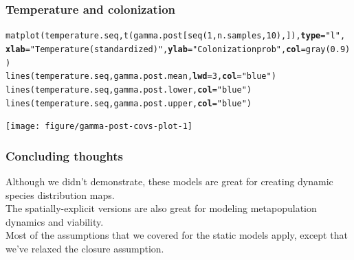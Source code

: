\documentclass[color=usenames,dvipsnames]{beamer}\usepackage[]{graphicx}\usepackage[]{color}
\makeatletter
\newcommand{\hlnum}[1]{\textcolor[rgb]{0.69,0.494,0}{#1}}%
\newcommand{\hlstr}[1]{\textcolor[rgb]{0.749,0.012,0.012}{#1}}%
\newcommand{\hlstd}[1]{\textcolor[rgb]{0,0,0}{#1}}%
\newcommand{\hlkwc}[1]{\textcolor[rgb]{0,0,0}{\textbf{#1}}}%
\newcommand{\hlkwd}[1]{\textcolor[rgb]{0.004,0.004,0.506}{#1}}%
\newenvironment{kframe}{%
 \def\at@end@of@kframe{}%
 \ifinner\ifhmode%
  \def\at@end@of@kframe{\end{minipage}}%
  \begin{minipage}{\columnwidth}%
 \fi\fi%
 \def\FrameCommand##1{\hskip\@totalleftmargin \hskip-\fboxsep
 \colorbox{shadecolor}{##1}\hskip-\fboxsep
     \hskip-\linewidth \hskip-\@totalleftmargin \hskip\columnwidth}%
 \MakeFramed {\advance\hsize-\width
   \@totalleftmargin\z@ \linewidth\hsize
   \@setminipage}}%
 {\par\unskip\endMakeFramed%
 \at@end@of@kframe}
\newenvironment{knitrout}{}{} %
\makeatother
\begin{document}
\begin{frame}[fragile]
  \frametitle{Temperature and colonization}
\begin{knitrout}\scriptsize
{}\color{fgcolor}\begin{kframe}
\begin{alltt}
\hlkwd{matplot}\hlstd{(temperature.seq,} \hlkwd{t}\hlstd{(gamma.post[}\hlkwd{seq}\hlstd{(}\hlnum{1}\hlstd{,n.samples,}\hlnum{10}\hlstd{),]),} \hlkwc{type}\hlstd{=}\hlstr{"l"}\hlstd{,}
        \hlkwc{xlab}\hlstd{=}\hlstr{"Temperature (standardized)"}\hlstd{,} \hlkwc{ylab}\hlstd{=}\hlstr{"Colonization prob"}\hlstd{,} \hlkwc{col}\hlstd{=}\hlkwd{gray}\hlstd{(}\hlnum{0.9}\hlstd{))}
\hlkwd{lines}\hlstd{(temperature.seq, gamma.post.mean,} \hlkwc{lwd}\hlstd{=}\hlnum{3}\hlstd{,} \hlkwc{col}\hlstd{=}\hlstr{"blue"}\hlstd{)}
\hlkwd{lines}\hlstd{(temperature.seq, gamma.post.lower,} \hlkwc{col}\hlstd{=}\hlstr{"blue"}\hlstd{)}
\hlkwd{lines}\hlstd{(temperature.seq, gamma.post.upper,} \hlkwc{col}\hlstd{=}\hlstr{"blue"}\hlstd{)}
\end{alltt}
\end{kframe}

{\centering \texttt{[image: figure/gamma-post-covs-plot-1]} 

}



\end{knitrout}
\end{frame}







\begin{frame}
  \frametitle{Concluding thoughts}
  Although we didn't demonstrate, these models are great for creating
  dynamic species distribution maps. \\
  \pause
  \vfill
  The spatially-explicit versions are also great for modeling
  metapopulation dynamics and viability. \\
  \pause
  \vfill
  Most of the assumptions that we covered for the static models apply,
  except that we've relaxed the closure assumption.
\end{frame}
\end{document}
